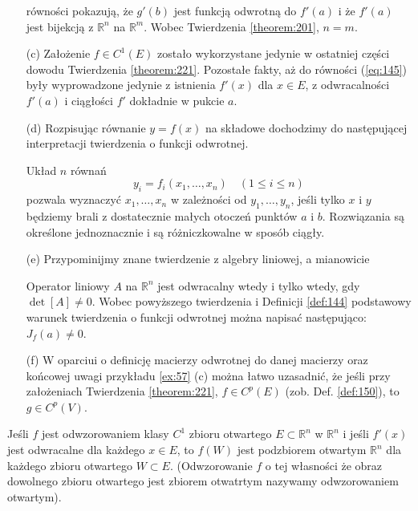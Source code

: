 \documentclass[leqno]{article}
\begin{document}
\begin{justify}
\begin{uwaga}
\begin{itemize}
            równości pokazują, że $g'(b)$ jest funkcją odwrotną do $f'(a)$ i że $f'(a)$ jest bijekcją z $\mathbb{R}^n$ na $\mathbb{R}^m$. Wobec Twierdzenia
            \ref{theorem:201}, $n = m$.
        \item [(c)]
            Założenie $f \in C^1(E)$ zostało wykorzystane jedynie w ostatniej części dowodu Twierdzenia \ref{theorem:221}. Pozostałe fakty, aż do
            równości (\ref{eq:145}) były wyprowadzone jedynie z istnienia $f'(x)$ dla $x \in E$, z odwracalności $f'(a)$ i ciągłości $f'$ dokładnie w pukcie $a$. 
        \item [(d)]
            Rozpisując równanie $y = f(x)$ na składowe dochodzimy do następującej interpretacji twierdzenia o funkcji odwrotnej. 
            \begin{textit}
                Układ $n$ równań 
                \[
                    y_i = f_i(x_1, \ldots, x_n) \quad (1 \leqslant i \leqslant n)
                \]
                pozwala wyznaczyć $x_1, \ldots, x_n$ w zależności od $y_1, \ldots, y_n$, jeśli tylko $x$ i $y$ będziemy brali 
                z dostatecznie małych otoczeń punktów $a$ i $b$. Rozwiązania są określone jednoznacznie i są różniczkowalne w sposób ciągły. 
            \end{textit}
        \item [(e)]
            Przypominijmy znane twierdzenie z algebry liniowej, a mianowicie 
            \begin{textit}
                Operator liniowy $A$ na $\mathbb{R}^n$ jest odwracalny wtedy i tylko wtedy, gdy $\det [A] \neq 0$. Wobec powyższego twierdzenia i Definicji \ref{def:144} podstawowy warunek twierdzenia o funkcji odwrotnej można napisać następująco: $J_f(a) \neq 0$.
            \end{textit}
        \item [(f)]
            W oparciui o definicję macierzy odwrotnej do danej macierzy oraz końcowej uwagi przykładu \ref{ex:57} (c)
            można łatwo uzasadnić, że jeśli przy założeniach Twierdzenia \ref{theorem:221}, $f \in C^p(E)$ (zob. Def. \ref{def:150}), to $g \in C^p(V)$.
    \end{itemize}
\end{uwaga}

\begin{wniosek}
    Jeśli $f$ jest odwzorowaniem klasy $C^1$ zbioru otwartego $E \subset \mathbb{R}^n$ w $\mathbb{R}^n$ i jeśli $f'(x)$ jest odwracalne 
    dla każdego $x \in E$, to $f(W)$ jest podzbiorem otwartym $\mathbb{R}^n$ dla każdego zbioru otwartego $W \subset E$. (Odwzorowanie $f$ o tej własności 
    że obraz dowolnego zbioru otwartego jest zbiorem otwatrtym nazywamy odwzorowaniem otwartym).
\end{wniosek}


\end{justify}
\end{document}
